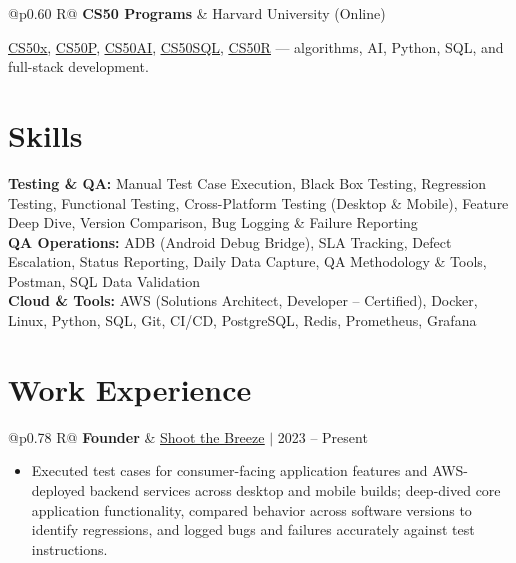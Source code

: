 \documentclass[a4paper,10pt]{article}
\newcommand{\ulink}[2]{\href{#1}{\uline{#2}}}
\newcommand{\subheading}[1]{{\color[HTML]{0A0A0A}\fontsize{12}{14}\selectfont\bfseries #1}}
\newcommand{\meta}[1]{{\color[HTML]{5C5C5C}\fontsize{10.5}{12.5}\selectfont #1}}
\begin{document}
\begin{tabularx}{\linewidth}{@{}p{0.60\linewidth} R@{}}
\subheading{CS50 Programs} & \meta{Harvard University (Online)}
\end{tabularx}
\vspace{1pt}
{\color[HTML]{3A3A3A}\fontsize{11}{14}\selectfont \ulink{https://cs50.harvard.edu/certificates/b14b78df-e05c-413e-a607-1dd27303053a}{CS50x}, \ulink{https://cs50.harvard.edu/certificates/32477052-9db4-49c4-a5a4-d7e58429ca2c}{CS50P}, \ulink{https://cs50.harvard.edu/certificates/9cdb4d4a-1250-4f8e-9fd7-191864e0f919}{CS50AI}, \ulink{https://cs50.harvard.edu/certificates/bc486f24-f085-4e61-8536-80940b97a1b9}{CS50SQL}, \ulink{https://cs50.harvard.edu/certificates/666838e6-a053-4d82-b179-a60fe745fd84}{CS50R} --- algorithms, AI, Python, SQL, and full-stack development.}

\vspace{2pt}

\section{Skills}
\vspace{3pt}
{\color[HTML]{0A0A0A}\fontsize{11}{14}\selectfont
\textbf{Testing \& QA:} Manual Test Case Execution, Black Box Testing, Regression Testing, Functional Testing, Cross-Platform Testing (Desktop \& Mobile), Feature Deep Dive, Version Comparison, Bug Logging \& Failure Reporting \\[2pt]
\textbf{QA Operations:} ADB (Android Debug Bridge), SLA Tracking, Defect Escalation, Status Reporting, Daily Data Capture, QA Methodology \& Tools, Postman, SQL Data Validation \\[2pt]
\textbf{Cloud \& Tools:} AWS (Solutions Architect, Developer -- Certified), Docker, Linux, Python, SQL, Git, CI/CD, PostgreSQL, Redis, Prometheus, Grafana}

\vspace{2pt}

\section{Work Experience}
\vspace{2pt}

\begin{tabularx}{\linewidth}{@{}p{0.78\linewidth} R@{}}
\subheading{Founder} & \meta{\ulink{https://shoot-the-breeze.vercel.app}{Shoot the Breeze} $|$ 2023 -- Present}
\end{tabularx}
\begin{itemize}[nosep, leftmargin=1.5em, itemsep=1pt, topsep=2pt]
  \item {\color[HTML]{0A0A0A}\fontsize{11}{14}\selectfont Executed test cases for consumer-facing application features and AWS-deployed backend services across desktop and mobile builds; deep-dived core application functionality, compared behavior across software versions to identify regressions, and logged bugs and failures accurately against test instructions.}
\end{itemize}
\end{document}
